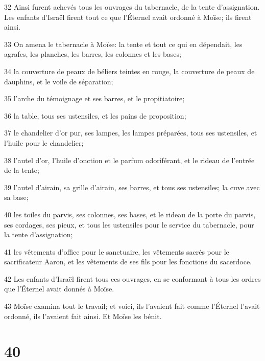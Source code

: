 \par 32 Ainsi furent achevés tous les ouvrages du tabernacle, de la tente d'assignation. Les enfants d'Israël firent tout ce que l'Éternel avait ordonné à Moïse; ils firent ainsi.
\par 33 On amena le tabernacle à Moïse: la tente et tout ce qui en dépendait, les agrafes, les planches, les barres, les colonnes et les bases;
\par 34 la couverture de peaux de béliers teintes en rouge, la couverture de peaux de dauphins, et le voile de séparation;
\par 35 l'arche du témoignage et ses barres, et le propitiatoire;
\par 36 la table, tous ses ustensiles, et les pains de proposition;
\par 37 le chandelier d'or pur, ses lampes, les lampes préparées, tous ses ustensiles, et l'huile pour le chandelier;
\par 38 l'autel d'or, l'huile d'onction et le parfum odoriférant, et le rideau de l'entrée de la tente;
\par 39 l'autel d'airain, sa grille d'airain, ses barres, et tous ses ustensiles; la cuve avec sa base;
\par 40 les toiles du parvis, ses colonnes, ses bases, et le rideau de la porte du parvis, ses cordages, ses pieux, et tous les ustensiles pour le service du tabernacle, pour la tente d'assignation;
\par 41 les vêtements d'office pour le sanctuaire, les vêtements sacrés pour le sacrificateur Aaron, et les vêtements de ses fils pour les fonctions du sacerdoce.
\par 42 Les enfants d'Israël firent tous ces ouvrages, en se conformant à tous les ordres que l'Éternel avait donnés à Moïse.
\par 43 Moïse examina tout le travail; et voici, ils l'avaient fait comme l'Éternel l'avait ordonné, ils l'avaient fait ainsi. Et Moïse les bénit.

\chapter{40}

